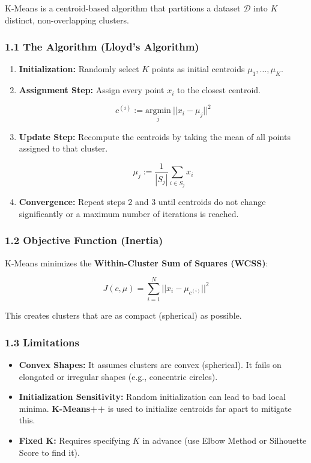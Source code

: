 \documentclass[
  italian,
  11pt,
]{article}
\begin{document}
K-Means is a centroid-based algorithm that partitions a dataset
\(\mathcal{D}\) into \(K\) distinct, non-overlapping clusters.

\subsubsection{1.1 The Algorithm (Lloyd's
Algorithm)}\label{the-algorithm-lloyds-algorithm}

\begin{enumerate}
\def\labelenumi{\arabic{enumi}.}
\item
  \textbf{Initialization:} Randomly select \(K\) points as initial
  centroids \(\mu_1, \dots, \mu_K\).
\item
  \textbf{Assignment Step:} Assign every point \(x_i\) to the closest
  centroid.

  \[c^{(i)} := \underset{j}{\text{argmin}} \ ||x_i - \mu_j||^2\]
\item
  \textbf{Update Step:} Recompute the centroids by taking the mean of
  all points assigned to that cluster.

  \[\mu_j := \frac{1}{|S_j|} \sum_{i \in S_j} x_i\]
\item
  \textbf{Convergence:} Repeat steps 2 and 3 until centroids do not
  change significantly or a maximum number of iterations is reached.
\end{enumerate}

\subsubsection{1.2 Objective Function
(Inertia)}\label{objective-function-inertia}

K-Means minimizes the \textbf{Within-Cluster Sum of Squares (WCSS)}:

\[J(c, \mu) = \sum_{i=1}^N ||x_i - \mu_{c^{(i)}}||^2\]

This creates clusters that are as compact (spherical) as possible.

\subsubsection{1.3 Limitations}\label{limitations}

\begin{itemize}
\item
  \textbf{Convex Shapes:} It assumes clusters are convex (spherical). It
  fails on elongated or irregular shapes (e.g., concentric circles).
\item
  \textbf{Initialization Sensitivity:} Random initialization can lead to
  bad local minima. \textbf{K-Means++} is used to initialize centroids
  far apart to mitigate this.
\item
  \textbf{Fixed K:} Requires specifying \(K\) in advance (use Elbow
  Method or Silhouette Score to find it).
\end{itemize}
\end{document}
